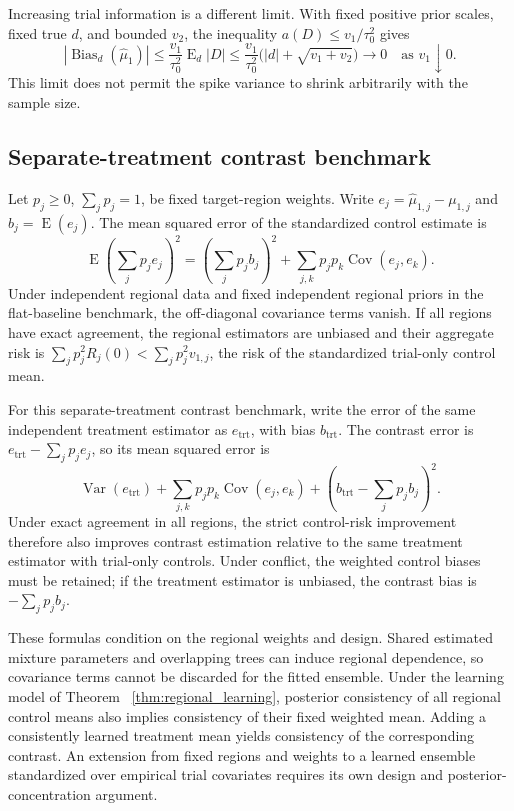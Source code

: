 \documentclass[11pt]{article}
\newcommand{\E}{\operatorname{E}}
\newcommand{\Var}{\operatorname{Var}}
\newcommand{\Cov}{\operatorname{Cov}}
\theoremstyle{remark}\newtheorem{remark}{Remark}[section]
\providecommand{\DIFaddtex}[1]{{\protect\color{blue} \sf #1}} %
\providecommand{\DIFaddbegin}{} %
\providecommand{\DIFaddend}{} %
\providecommand{\DIFadd}[1]{\texorpdfstring{\DIFaddtex{#1}}{#1}} %
\begin{document}
Increasing trial information is a different limit. With fixed positive prior scales, fixed true $d$, and bounded $v_2$, the inequality $a(D)\leq v_1/\tau_0^2$ gives
\begin{equation}\label{eq:regional_increasing_trial}
|\operatorname{Bias}_d(\widehat\mu_1)|
\leq\frac{v_1}{\tau_0^2}\E_d|D|
\leq\frac{v_1}{\tau_0^2}\bigl(|d|+\sqrt{v_1+v_2}\bigr)
\longrightarrow0\quad\text{as }v_1\downarrow0.
\end{equation}
This limit does not permit the spike variance to shrink arbitrarily with the sample size.

\subsection{ \DIFaddbegin \DIFadd{Separate-treatment contrast benchmark}\DIFaddend }\label{sec:C.4}
Let $p_j\geq0$, $\sum_jp_j=1$, be fixed target-region weights. Write $e_j=\widehat\mu_{1,j}-\mu_{1,j}$ and $b_j=\E(e_j)$. The mean squared error of the standardized control estimate is
\begin{equation}\label{eq:regional_aggregate_risk}
\E\!\left(\sum_jp_je_j\right)^2
=\left(\sum_jp_jb_j\right)^2+
\sum_{j,k}p_jp_k\Cov(e_j,e_k).
\end{equation}
Under independent regional data and fixed independent regional priors in the flat-baseline benchmark, the off-diagonal covariance terms vanish. If all regions have exact agreement, the regional estimators are unbiased and their aggregate risk is $\sum_jp_j^2R_j(0)<\sum_jp_j^2v_{1,j}$, the risk of the standardized trial-only control mean.

For  \DIFaddbegin \DIFadd{this separate-treatment contrast benchmark}\DIFaddend , write the error of the same independent treatment estimator as $e_{\mathrm{trt}}$, with bias $b_{\mathrm{trt}}$. The contrast error is $e_{\mathrm{trt}}-\sum_jp_je_j$, so its mean squared error is
\[
\Var(e_{\mathrm{trt}})+\sum_{j,k}p_jp_k\Cov(e_j,e_k)
+\left(b_{\mathrm{trt}}-\sum_jp_jb_j\right)^2.
\]
Under exact agreement in all regions, the strict control-risk improvement therefore also improves contrast estimation relative to the same treatment estimator with trial-only controls. Under conflict, the weighted control biases must be retained; if the treatment estimator is unbiased, the contrast bias is $-\sum_jp_jb_j$.

These formulas condition on the regional weights and design. Shared estimated mixture parameters and overlapping trees can induce regional dependence, so covariance terms cannot be discarded for the fitted ensemble. Under the learning model of Theorem~ \DIFaddbegin \DIFadd{\ref{thm:regional_learning}}\DIFaddend , posterior consistency of all regional control means also implies consistency of their fixed weighted mean. Adding a consistently learned treatment mean yields consistency of the corresponding contrast. An extension from fixed regions and weights to a learned ensemble standardized over empirical trial covariates requires its own design and posterior-concentration argument.
\end{document}

